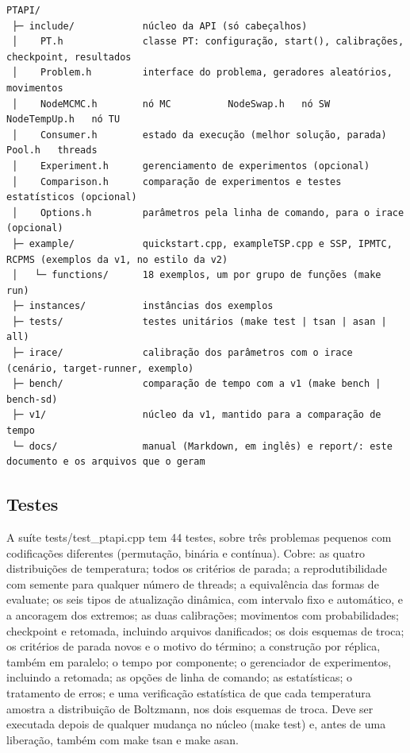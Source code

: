 \documentclass[10pt,a4paper]{article}
\newcommand{\code}[1]{{\ttfamily #1}}
\begin{document}
\begin{lstlisting}[style=saida]
PTAPI/
 ├─ include/            núcleo da API (só cabeçalhos)
 │    PT.h              classe PT: configuração, start(), calibrações, checkpoint, resultados
 │    Problem.h         interface do problema, geradores aleatórios, movimentos
 │    NodeMCMC.h        nó MC          NodeSwap.h   nó SW          NodeTempUp.h   nó TU
 │    Consumer.h        estado da execução (melhor solução, parada)     Pool.h   threads
 │    Experiment.h      gerenciamento de experimentos (opcional)
 │    Comparison.h      comparação de experimentos e testes estatísticos (opcional)
 │    Options.h         parâmetros pela linha de comando, para o irace (opcional)
 ├─ example/            quickstart.cpp, exampleTSP.cpp e SSP, IPMTC, RCPMS (exemplos da v1, no estilo da v2)
 │   └─ functions/      18 exemplos, um por grupo de funções (make run)
 ├─ instances/          instâncias dos exemplos
 ├─ tests/              testes unitários (make test | tsan | asan | all)
 ├─ irace/              calibração dos parâmetros com o irace (cenário, target-runner, exemplo)
 ├─ bench/              comparação de tempo com a v1 (make bench | bench-sd)
 ├─ v1/                 núcleo da v1, mantido para a comparação de tempo
 └─ docs/               manual (Markdown, em inglês) e report/: este documento e os arquivos que o geram
\end{lstlisting}

\subsection*{Testes}

A suíte \code{tests/\allowbreak{}test\_\allowbreak{}ptapi.cpp} tem 44 testes, sobre três problemas pequenos com codificações diferentes (permutação, binária e contínua). Cobre: as quatro distribuições de temperatura; todos os critérios de parada; a reprodutibilidade com semente para qualquer número de threads; a equivalência das formas de \code{evaluate}; os seis tipos de atualização dinâmica, com intervalo fixo e automático, e a ancoragem dos extremos; as duas calibrações; movimentos com probabilidades; checkpoint e retomada, incluindo arquivos danificados; os dois esquemas de troca; os critérios de parada novos e o motivo do término; a construção por réplica, também em paralelo; o tempo por componente; o gerenciador de experimentos, incluindo a retomada; as opções de linha de comando; as estatísticas; o tratamento de erros; e uma verificação estatística de que cada temperatura amostra a distribuição de Boltzmann, nos dois esquemas de troca. Deve ser executada depois de qualquer mudança no núcleo (\code{make test}) e, antes de uma liberação, também com \code{make tsan} e \code{make asan}.
\end{document}
